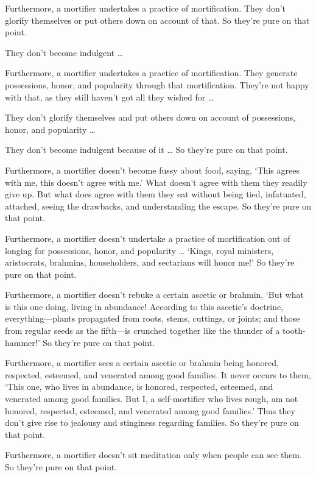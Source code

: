 \documentclass[12pt,openany]{book}%
\begin{document}
Furthermore, a mortifier undertakes a practice of mortification. They don’t glorify themselves or put others down on account of that. So they’re pure on that point. 

They don’t become indulgent … 

Furthermore, a mortifier undertakes a practice of mortification. They generate possessions, honor, and popularity through that mortification. They’re not happy with that, as they still haven’t got all they wished for … 

They don’t glorify themselves and put others down on account of possessions, honor, and popularity … 

They don’t become indulgent because of it … So they’re pure on that point. 

Furthermore, a mortifier doesn’t become fussy about food, saying, ‘This agrees with me, this doesn’t agree with me.’ What doesn’t agree with them they readily give up. But what does agree with them they eat without being tied, infatuated, attached, seeing the drawbacks, and understanding the escape. So they’re pure on that point. 

Furthermore, a mortifier doesn’t undertake a practice of mortification out of longing for possessions, honor, and popularity … ‘Kings, royal ministers, aristocrats, brahmins, householders, and sectarians will honor me!’ So they’re pure on that point. 

Furthermore, a mortifier doesn’t rebuke a certain ascetic or brahmin, ‘But what is this one doing, living in abundance! According to this ascetic’s doctrine, everything—plants propagated from roots, stems, cuttings, or joints; and those from regular seeds as the fifth—is crunched together like the thunder of a tooth-hammer!’ So they’re pure on that point. 

Furthermore, a mortifier sees a certain ascetic or brahmin being honored, respected, esteemed, and venerated among good families. It never occurs to them, ‘This one, who lives in abundance, is honored, respected, esteemed, and venerated among good families. But I, a self-mortifier who lives rough, am not honored, respected, esteemed, and venerated among good families.’ Thus they don’t give rise to jealousy and stinginess regarding families. So they’re pure on that point. 

Furthermore, a mortifier doesn’t sit meditation only when people can see them. So they’re pure on that point. 
\end{document}
